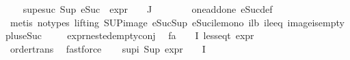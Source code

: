 \begin{isabellebody}
\ \ \isamarkupfalse%
\ sup{\isacharunderscore}{\kern0pt}esuc{\isacharcolon}{\kern0pt}\ {\isachardoublequoteopen}Sup\ {\isacharparenleft}{\kern0pt}{\isacharparenleft}{\kern0pt}eSuc\ {\isasymcirc}\ expr{\isacharunderscore}{\kern0pt}{}\ {\isasymcirc}\ {\isasymPhi}{\isacharparenright}{\kern0pt}\ {\isacharbackquote}{\kern0pt}\ J{\isacharparenright}{\kern0pt}\ {\isasymle}\ {}{\isachardoublequoteclose}\isanewline
\ \ \ \ \isamarkupfalse%
\ one{\isacharunderscore}{\kern0pt}add{\isacharunderscore}{\kern0pt}one\ eSuc{\isacharunderscore}{\kern0pt}def\isanewline
\ \ \ \ \isamarkupfalse%
\ {\isacharparenleft}{\kern0pt}metis\ {\isacharparenleft}{\kern0pt}no{\isacharunderscore}{\kern0pt}types{\isacharcomma}{\kern0pt}\ lifting{\isacharparenright}{\kern0pt}\ SUP{\isacharunderscore}{\kern0pt}image\ eSuc{\isacharunderscore}{\kern0pt}Sup\ eSuc{\isacharunderscore}{\kern0pt}ile{\isacharunderscore}{\kern0pt}mono\ i{}{\isacharunderscore}{\kern0pt}lb\ ile{}{\isacharunderscore}{\kern0pt}eq\ image{\isacharunderscore}{\kern0pt}is{\isacharunderscore}{\kern0pt}empty\ plus{\isacharunderscore}{\kern0pt}{}{\isacharunderscore}{\kern0pt}eSuc{\isacharparenleft}{\kern0pt}{}{\isacharparenright}{\kern0pt}{\isacharparenright}{\kern0pt}\isanewline
\ \ \isamarkupfalse%
\ {}\ expr{\isacharunderscore}{\kern0pt}nested{\isacharunderscore}{\kern0pt}empty{\isacharunderscore}{\kern0pt}conj\ \isamarkupfalse%
\ fa{\isacharcolon}{\kern0pt}\ {\isachardoublequoteopen}\ {\isasymforall}{\isasymphi}{\isasymin}{\isasymPhi}\ {\isacharbackquote}{\kern0pt}\ I{\isachardot}{\kern0pt}\ less{\isacharunderscore}{\kern0pt}eq{\isacharunderscore}{\kern0pt}t\ {\isacharparenleft}{\kern0pt}expr\ {\isasymphi}{\isacharparenright}{\kern0pt}\ {\isacharparenleft}{\kern0pt}{}{\isacharcomma}{\kern0pt}\ {\isasyminfinity}{\isacharcomma}{\kern0pt}\ {}{\isacharcomma}{\kern0pt}\ {}{\isacharcomma}{\kern0pt}\ {}{\isacharcomma}{\kern0pt}\ {}{\isacharparenright}{\kern0pt}{\isachardoublequoteclose}\isanewline
\ \ \ \ \isamarkupfalse%
\ order{\isacharunderscore}{\kern0pt}trans\ \isamarkupfalse%
\ fastforce\isanewline
\ \ \isamarkupfalse%
\ sup{\isacharunderscore}{\kern0pt}i{\isacharcolon}{\kern0pt}\ {\isachardoublequoteopen}Sup\ {\isacharparenleft}{\kern0pt}{\isacharparenleft}{\kern0pt}expr{\isacharunderscore}{\kern0pt}{}\ {\isasymcirc}\ {\isasymPhi}{\isacharparenright}{\kern0pt}\ {\isacharbackquote}{\kern0pt}\ I{\isacharparenright}{\kern0pt}\ {\isasymle}\ {}{\isachardoublequoteclose}\isanewline

\end{isabellebody}
